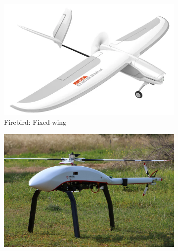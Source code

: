 \begin{figure}[htb!]
  \centering

  \begin{subfigure}[t]{.32\textwidth}\centering
    \includegraphics[width=\linewidth]{./img/png/uav-FirebirdFPV-FixedWing.png}
    \caption{Firebird: Fixed-wing~\cite{firebirdDrone}}
    \label{fig:uav-fixed-wing}
  \end{subfigure}\hfill
  \begin{subfigure}[t]{.32\textwidth}\centering
    \includegraphics[width=\linewidth]{./img/jpg/uav-velos-singleRotor.jpg}

\end{subfigure}
\end{figure}
